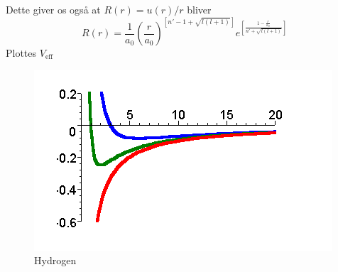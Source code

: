 Dette giver os også at $R(r) = u(r)/r$ bliver
\begin{equation}
  R(r) = \frac{1}{a_0}{\left(\frac{r}{a_0}\right)}^{\left[n'-1+\sqrt{l(l+1)}\right]} e^{\left[\frac{1-\frac{r}{a_0}}{n'+\sqrt{l(l+1)}}\right]}
\end{equation}
Plottes $V_{\text{eff}}$

\begin{figure}[h!]
    \centering
    \includegraphics[width=\columnwidth]{hydrogen}
    \caption{Hydrogen}
    \label{fig:hydrogen}
\end{figure}


%

